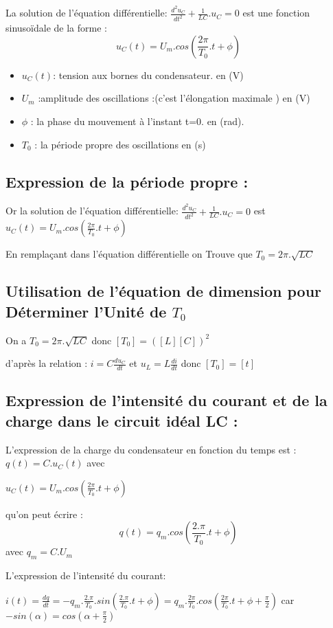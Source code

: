 \documentclass[12pt]{article}
\begin{document}
La solution de l'équation différentielle: $\frac{d^2u_C}{dt^2} + \frac{1}{LC}.u_C = 0$
est une fonction sinusoïdale de la forme : 
$$u_C(t) = U_m.cos(\frac{2\pi}{T_0}.t + \phi) $$

\begin{itemize}
	\item $u_C (t)$: tension aux bornes du condensateur. en (V)
	\item $U_m$ :amplitude des oscillations :(c'est l'élongation maximale ) en (V)
	\item $\phi$ : la phase du mouvement à l'instant t=0. en (rad).
	\item $T_0$ : la période propre des oscillations en (s)
\end{itemize}

\subsection{Expression de la période propre : }

Or la solution de l'équation différentielle: $\frac{d^2u_C}{dt^2} + \frac{1}{LC}.u_C = 0$ est $u_C(t) = U_m.cos(\frac{2\pi}{T_0}.t + \phi) $

En remplaçant dans l'équation différentielle on Trouve que $T_0 = 2\pi.\sqrt{LC}$

\subsection{Utilisation de l'équation de dimension pour Déterminer l'Unité de $T_0$}

On a $T_0 = 2\pi.\sqrt{LC}$ donc $[T_0] = ([L][C])^2$

d'après la relation : $i = C\frac{du_C}{dt}$ et $u_L = L\frac{di}{dt}$ donc $[T_0] = [t]$

\subsection{Expression de l'intensité du courant et de la charge dans le circuit idéal LC : }

L'expression de la charge du condensateur en fonction du temps est : $q(t) = C.u_C(t)$ avec

$u_C(t) = U_m.cos(\frac{2\pi}{T_0}.t + \phi)$

qu'on peut écrire  :$$q(t) = q_m.cos(\frac{2.\pi}{T_0}.t + \phi)$$ avec $q_m = C.U_m$

L'expression de l'intensité du courant: 

$i(t) = \frac{dq}{dt} = -q_m.\frac{2.\pi}{T_0} . sin(\frac{2.\pi}{T_0}.t + \phi) = q_m.\frac{2\pi}{T_0}.cos(\frac{2\pi}{T_0}.t + \phi + \frac{\pi}{2})$  car $-sin(\alpha) = cos(\alpha + \frac{\pi}{2})$
\end{document}

